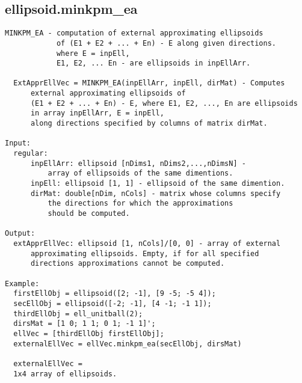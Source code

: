 \subsection{\texorpdfstring{ellipsoid.minkpm\_ea}{minkpm\_ea}}\label{method:ellipsoid.minkpmea}
\begin{verbatim}
MINKPM_EA - computation of external approximating ellipsoids
            of (E1 + E2 + ... + En) - E along given directions.
            where E = inpEll,
            E1, E2, ... En - are ellipsoids in inpEllArr.

  ExtApprEllVec = MINKPM_EA(inpEllArr, inpEll, dirMat) - Computes
      external approximating ellipsoids of
      (E1 + E2 + ... + En) - E, where E1, E2, ..., En are ellipsoids
      in array inpEllArr, E = inpEll,
      along directions specified by columns of matrix dirMat.

Input:
  regular:
      inpEllArr: ellipsoid [nDims1, nDims2,...,nDimsN] -
          array of ellipsoids of the same dimentions.
      inpEll: ellipsoid [1, 1] - ellipsoid of the same dimention.
      dirMat: double[nDim, nCols] - matrix whose columns specify
          the directions for which the approximations
          should be computed.

Output:
  extApprEllVec: ellipsoid [1, nCols]/[0, 0] - array of external
      approximating ellipsoids. Empty, if for all specified
      directions approximations cannot be computed.

Example:
  firstEllObj = ellipsoid([2; -1], [9 -5; -5 4]);
  secEllObj = ellipsoid([-2; -1], [4 -1; -1 1]);
  thirdEllObj = ell_unitball(2);
  dirsMat = [1 0; 1 1; 0 1; -1 1]';
  ellVec = [thirdEllObj firstEllObj];
  externalEllVec = ellVec.minkpm_ea(secEllObj, dirsMat)

  externalEllVec =
  1x4 array of ellipsoids.
\end{verbatim}
